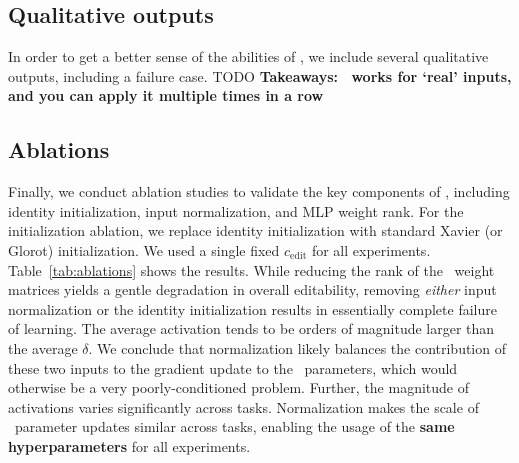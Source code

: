 \documentclass{article}
\begin{document}


\subsection{Qualitative outputs}
In order to get a better sense of the abilities of \name, we include several qualitative outputs, including a failure case. TODO \textbf{Takeaways: \name~works for `real' inputs, and you can apply it multiple times in a row}



\subsection{Ablations}
\label{sec:ablations}
Finally, we conduct ablation studies to validate the key components of \name, including identity initialization, input normalization, and MLP weight rank. For the initialization ablation, we replace identity initialization with standard Xavier (or Glorot) initialization. We used a single fixed $c_\text{edit}$ for all experiments. Table~\ref{tab:ablations} shows the results. While reducing the rank of the \name~weight matrices yields a gentle degradation in overall editability, removing \textit{either} input normalization or the identity initialization results in essentially complete failure of learning. The average activation tends to be orders of magnitude larger than the average $\delta$. We conclude that normalization likely balances the contribution of these two inputs to the gradient update to the \name~parameters, which would otherwise be a very poorly-conditioned problem. Further, the magnitude of activations varies significantly across tasks. Normalization makes the scale of \name~parameter updates similar across tasks, enabling the usage of the \textbf{same hyperparameters} for all experiments.


\end{document}
